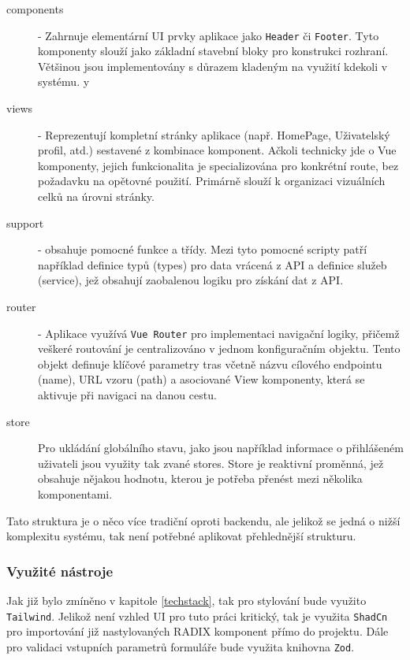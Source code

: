\begin{description}
    \item[components] - Zahrnuje elementární UI prvky aplikace jako \texttt{Header} či \texttt{Footer}. Tyto komponenty slouží jako základní stavební bloky pro konstrukci rozhraní. Většinou jsou implementovány s důrazem kladeným na využití kdekoli v systému.
y    \item[views] - Reprezentují kompletní stránky aplikace (např. HomePage, Uživatelský profil, atd.) sestavené z kombinace komponent. Ačkoli technicky jde o Vue komponenty, jejich funkcionalita je specializována pro konkrétní route, bez požadavku na opětovné použití. Primárně slouží k organizaci vizuálních celků na úrovni stránky.
    \item[support] - obsahuje pomocné funkce a třídy. Mezi tyto pomocné scripty patří například definice typů (types) pro data vrácená z API a definice služeb (service), jež obsahují zaobalenou logiku pro získání dat z API.
    \item[router] - Aplikace využívá \texttt{Vue Router} pro implementaci navigační logiky, přičemž veškeré routování je centralizováno v jednom konfiguračním objektu. Tento objekt definuje klíčové parametry tras včetně názvu cílového endpointu (name), URL vzoru (path) a asociované View komponenty, která se aktivuje při navigaci na danou cestu.
    \item[store]
    Pro ukládání globálního stavu, jako jsou například informace o přihlášeném uživateli jsou využity tak zvané stores. Store je reaktivní proměnná, jež obsahuje nějakou hodnotu, kterou je potřeba přenést mezi několika komponentami.
\end{description}

Tato struktura je o něco více tradiční oproti backendu, ale jelikož se jedná o nižší komplexitu systému, tak není potřebné aplikovat přehlednější strukturu.

\subsubsection{Využité nástroje}
Jak již bylo zmíněno v kapitole \ref{techstack}, tak pro stylování bude využito \texttt{Tailwind}. Jelikož není vzhled UI pro tuto práci kritický, tak je využita \texttt{ShadCn} pro importování již nastylovaných RADIX komponent přímo do projektu. Dále pro validaci vstupních parametrů formuláře bude využita knihovna \texttt{Zod}.


